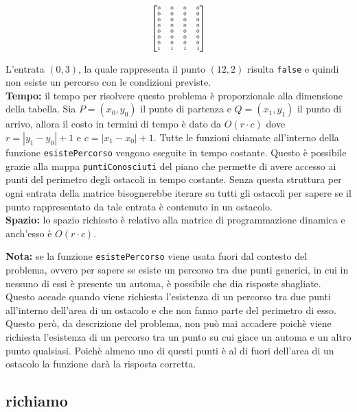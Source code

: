 \documentclass[a4paper,11pt]{article}
\begin{document}
\[
\tiny
\begin{bmatrix}
0 & 0 & 0 & 0 \\
0 & 0 & 0 & 0 \\
0 & 0 & 0 & 0 \\
0 & 0 & 0 & 0 \\
0 & 0 & 0 & 0 \\
0 & 0 & 0 & 0 \\
0 & 0 & 0 & 0 \\
1 & 1 & 1 & 1 \\
\end{bmatrix}
\]

L'entrata $(0, 3)$, la quale rappresenta il punto $(12, 2)$ risulta \texttt{false} e quindi non esiste un percorso con le condizioni previste.\\
\textbf{Tempo:} il tempo per risolvere questo problema è proporzionale alla dimensione della tabella. Sia $P = (x_0, y_0)$ il punto di partenza e $Q = (x_1, y_1)$ il punto di arrivo, allora il costo in termini di tempo è dato da $O(r \cdot c)$ dove $r = |y_1 - y_0| +1 $ e $c = |x_1 - x_0| + 1$. Tutte le funzioni chiamate all'interno della funzione \texttt{esistePercorso} vengono eseguite in tempo costante. Questo è possibile grazie alla mappa \texttt{puntiConosciuti} del piano che permette di avere accesso ai punti del perimetro degli ostacoli in tempo costante. Senza questa struttura per ogni entrata della matrice bisognerebbe iterare su tutti gli ostacoli per sapere se il punto rappresentato da tale entrata è contenuto in un ostacolo.\\
\textbf{Spazio:} lo spazio richiesto è relativo alla matrice di programmazione dinamica e anch'esso è $O(r \cdot c)$.

\textbf{Nota:} se la funzione \texttt{esistePercorso} viene usata fuori dal contesto del problema, ovvero per sapere se esiste un percorso tra due punti generici, in cui in nessuno di essi è presente un automa, è possibile che dia risposte sbagliate. Questo accade quando viene richiesta l'esistenza di un percorso tra due punti all'interno dell'area di un ostacolo e che non fanno parte del perimetro di esso. Questo però, da descrizione del problema, non può mai accadere poichè viene richiesta l'esistenza di un percorso tra un punto su cui giace un automa e un altro punto qualsiasi. Poichè almeno uno di questi punti è al di fuori dell'area di un ostacolo la funzione darà la risposta corretta. 


\subsection{richiamo}
\end{document}
